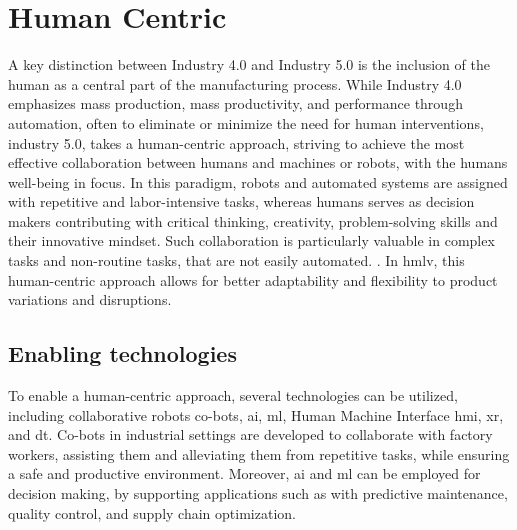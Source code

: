 \section{Human Centric}\label{sec:human-centric}

A key distinction between Industry 4.0 and Industry 5.0 is the inclusion of the human as a central part of the manufacturing process.
While Industry 4.0 emphasizes mass production, mass productivity, and performance through automation, often to eliminate or minimize the need for human interventions,
industry 5.0, takes a human-centric approach, striving to achieve the most effective collaboration between humans and machines or robots, with the humans well-being in focus.
In this paradigm, robots and automated systems are assigned with repetitive and labor-intensive tasks, whereas humans serves as decision makers contributing with critical thinking, 
creativity, problem-solving skills and their innovative mindset.
Such collaboration is particularly valuable in complex tasks and non-routine tasks, that are not easily automated.
\cite{MADDIKUNTA2022100257}.
In \ac{hmlv}, this human-centric approach allows for better adaptability and flexibility to product variations and disruptions.



\subsection{Enabling technologies}
To enable a human-centric approach, several technologies can be utilized, including collaborative robots \ac{co-bots}, \ac{ai}, \ac{ml}, Human Machine Interface \ac{hmi}, \ac{xr}, and \ac{dt}.
Co-bots in industrial settings are developed to collaborate with factory workers, assisting them and alleviating them from repetitive tasks, while ensuring a safe and productive environment.
Moreover, \ac{ai} and \ac{ml} can be employed for decision making, by supporting applications such as with predictive maintenance, quality control, and supply chain optimization.


